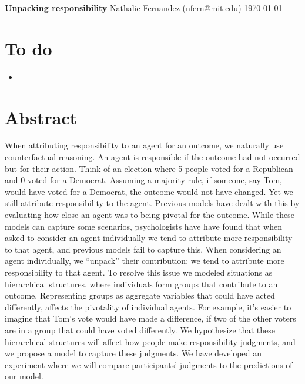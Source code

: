 \documentclass[11pt]{article}
\begin{document}
\begin{center} 
{\LARGE \textbf{Unpacking responsibility}}
\linebreak
\linebreak
{\large Nathalie Fernandez (\href{mailto:nfern@mit.edu}{nfern@mit.edu})}
\linebreak
\today
\end{center} 

\tableofcontents 
\clearpage 

\section{To do}
\label{sec:to_do}

\begin{itemize}
	\item 
\end{itemize}

\newpage
\section{Abstract}
  \vspace{.5cm}
	When attributing responsibility to an agent for an outcome, we naturally use counterfactual reasoning. An agent is responsible if the outcome had not occurred but for their action. Think of an election where 5 people voted for a Republican and 0 voted for a Democrat. Assuming a majority rule, if someone, say Tom, would have voted for a Democrat, the outcome would not have changed. Yet we still attribute responsibility to the agent. Previous models have dealt with this by evaluating how close an agent was to being pivotal for the outcome. While these models can capture some scenarios, psychologists have have found that when asked to consider an agent individually we tend to attribute more responsibility to that agent, and previous models fail to capture this. When considering an agent individually, we “unpack” their contribution: we tend to attribute more responsibility to that agent. To resolve this issue we modeled situations as hierarchical structures, where individuals form groups that contribute to an outcome. Representing groups as aggregate variables that could have acted differently, affects the pivotality of individual agents. For example, it's easier to imagine that Tom's vote would have made a difference, if two of the other voters are in a group that could have voted differently. We hypothesize that these hierarchical structures will affect how people make responsibility judgments, and we propose a model to capture these judgments. We have developed an experiment where we will compare participants' judgments to the predictions of our model.
\end{document}
